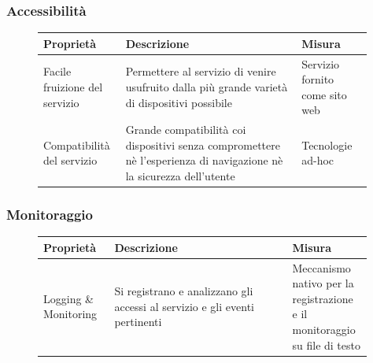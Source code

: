 \documentclass{article}
\begin{document}
\clearpage

\subsubsection{Accessibilità}\label{rnf_6}
\begin{description}
	\item[]
	    
	\begin{table}[!htbp]
		\begin{tabular} {|>{\raggedright\arraybackslash}m{0.20\linewidth} | >{\raggedright\arraybackslash}m{0.50\linewidth}|>{\raggedright\arraybackslash}m{0.20\linewidth}|}
			\hline
			\textbf{Proprietà}                                                                                                        &   
			\textbf{Descrizione}                                                                                                       &   
			\textbf{Misura} \\ \hline
			Facile fruizione del servizio                                                                                              &   
			Permettere al servizio di venire usufruito dalla più grande varietà di dispositivi possibile                             &   
			Servizio fornito come sito web \\ \hline
			Compatibilità del servizio                                                                                                &   
			Grande compatibilità coi dispositivi senza compromettere nè l'esperienza di navigazione nè la sicurezza dell'utente &   
			Tecnologie ad-hoc \\ \hline
		\end{tabular}
	\end{table}
	    
\end{description}

\subsubsection{Monitoraggio}\label{rnf_7}
\begin{description}
	\item[]
	    
	\begin{table}[!htbp]
		\begin{tabular} {|>{\raggedright\arraybackslash}m{0.20\linewidth} | >{\raggedright\arraybackslash}m{0.50\linewidth}|>{\raggedright\arraybackslash}m{0.20\linewidth}|}
			\hline
			\textbf{Proprietà}                                                        &   
			\textbf{Descrizione}                                                       &   
			\textbf{Misura} \\ \hline
			Logging \& Monitoring                                                      &   
			Si registrano e analizzano gli accessi al servizio e gli eventi pertinenti &   
			Meccanismo nativo per la registrazione e il monitoraggio su file di testo \\ \hline
		\end{tabular}
	\end{table}
	    
\end{description}
\end{document}
